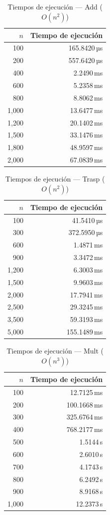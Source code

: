 \documentclass{article}
\begin{document}
\begin{table}[ht]
  \centering
  \caption{Tiempos de ejecución — Add ($O(n^2)$)}
  \label{tab:add}
  \begin{tabular}{rr}
    \toprule
    $n$ & Tiempo de ejecución \\
    \midrule
    100 & 165.8420\,µs \\
    200 & 557.6420\,µs \\
    400 & 2.2490\,ms \\
    600 & 5.2358\,ms \\
    800 & 8.8062\,ms \\
    1,000 & 13.6477\,ms \\
    1,200 & 20.1402\,ms \\
    1,500 & 33.1476\,ms \\
    1,800 & 48.9597\,ms \\
    2,000 & 67.0839\,ms \\
    \bottomrule
  \end{tabular}
\end{table}

\begin{table}[ht]
  \centering
  \caption{Tiempos de ejecución — Trasp ($O(n^2)$)}
  \label{tab:trasp}
  \begin{tabular}{rr}
    \toprule
    $n$ & Tiempo de ejecución \\
    \midrule
    100 & 41.5410\,µs \\
    300 & 372.5950\,µs \\
    600 & 1.4871\,ms \\
    900 & 3.3472\,ms \\
    1,200 & 6.3003\,ms \\
    1,500 & 9.9603\,ms \\
    2,000 & 17.7941\,ms \\
    2,500 & 29.3245\,ms \\
    3,500 & 59.3193\,ms \\
    5,000 & 155.1489\,ms \\
    \bottomrule
  \end{tabular}
\end{table}

\begin{table}[ht]
  \centering
  \caption{Tiempos de ejecución — Mult ($O(n^3)$)}
  \label{tab:mult}
  \begin{tabular}{rr}
    \toprule
    $n$ & Tiempo de ejecución \\
    \midrule
    100 & 12.7125\,ms \\
    200 & 100.1668\,ms \\
    300 & 325.6764\,ms \\
    400 & 768.2177\,ms \\
    500 & 1.5144\,s \\
    600 & 2.6010\,s \\
    700 & 4.1743\,s \\
    800 & 6.2492\,s \\
    900 & 8.9168\,s \\
    1,000 & 12.2373\,s \\
    \bottomrule
  \end{tabular}
\end{table}
\end{document}
